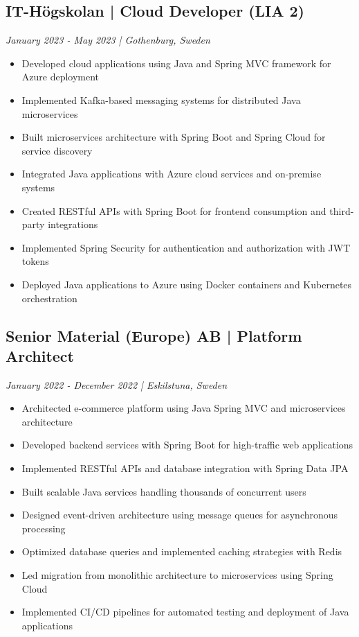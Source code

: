 \documentclass[11pt,a4paper]{article}
\begin{document}
\subsection*{IT-Högskolan | Cloud Developer (LIA 2)}
\textit{January 2023 - May 2023 | Gothenburg, Sweden}

\begin{itemize}[leftmargin=*, itemsep=2pt]
\item Developed cloud applications using Java and Spring MVC framework for Azure deployment
\item Implemented Kafka-based messaging systems for distributed Java microservices
\item Built microservices architecture with Spring Boot and Spring Cloud for service discovery
\item Integrated Java applications with Azure cloud services and on-premise systems
\item Created RESTful APIs with Spring Boot for frontend consumption and third-party integrations
\item Implemented Spring Security for authentication and authorization with JWT tokens
\item Deployed Java applications to Azure using Docker containers and Kubernetes orchestration
\end{itemize}

\subsection*{Senior Material (Europe) AB | Platform Architect}
\textit{January 2022 - December 2022 | Eskilstuna, Sweden}

\begin{itemize}[leftmargin=*, itemsep=2pt]
\item Architected e-commerce platform using Java Spring MVC and microservices architecture
\item Developed backend services with Spring Boot for high-traffic web applications
\item Implemented RESTful APIs and database integration with Spring Data JPA
\item Built scalable Java services handling thousands of concurrent users
\item Designed event-driven architecture using message queues for asynchronous processing
\item Optimized database queries and implemented caching strategies with Redis
\item Led migration from monolithic architecture to microservices using Spring Cloud
\item Implemented CI/CD pipelines for automated testing and deployment of Java applications
\end{itemize}
\end{document}
